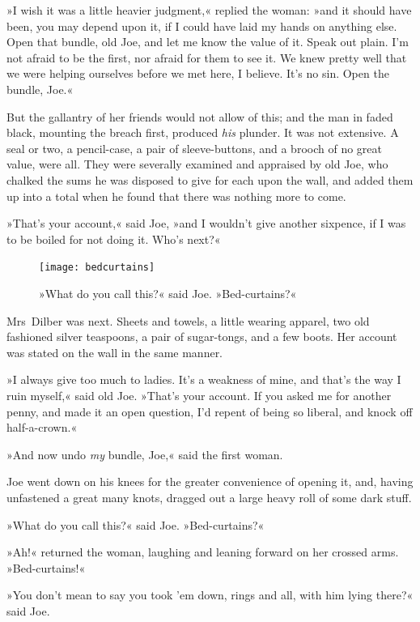 »I wish it was a little heavier judgment,« replied the woman: »and it should have been, you may depend upon it, if I could have laid my hands on anything else. Open that bundle, old Joe, and let me know the value of it. Speak out plain. I'm not afraid to be the first, nor afraid for them to see it. We knew pretty well that we were helping ourselves before we met here, I believe. It's no sin. Open the bundle, Joe.«

But the gallantry of her friends would not allow of this; and the man in faded black, mounting the breach first, produced \textit{his} plunder. It was not extensive. A seal or two, a pencil-case, a pair of sleeve-buttons, and a brooch of no great value, were all. They were severally examined and appraised by old Joe, who chalked the sums he was disposed to give for each upon the wall, and added them up into a total when he found that there was nothing more to come.

»That's your account,« said Joe, »and I wouldn't give another sixpence, if I was to be boiled for not doing it. Who's next?«

\begin{figure}[p]
\centering
\texttt{[image: bedcurtains]}
\caption[\textbf{»Bed-curtains«}]{»What do you call this?« said Joe. »Bed-curtains?«}
\end{figure}

Mrs~Dilber was next. Sheets and towels, a little wearing apparel, two old fashioned silver teaspoons, a pair of sugar-tongs, and a few boots. Her account was stated on the wall in the same manner.

»I always give too much to ladies. It's a weakness of mine, and that's the way I ruin myself,« said old Joe. »That's your account. If you asked me for another penny, and made it an open question, I'd repent of being so liberal, and knock off half-a-crown.«

»And now undo \textit{my} bundle, Joe,« said the first woman.

Joe went down on his knees for the greater convenience of opening it, and, having unfastened a great many knots, dragged out a large heavy roll of some dark stuff.

»What do you call this?« said Joe. »Bed-curtains?«

»Ah!« returned the woman, laughing and leaning forward on her crossed arms. »Bed-curtains!«

»You don't mean to say you took 'em down, rings and all, with him lying there?« said Joe.

